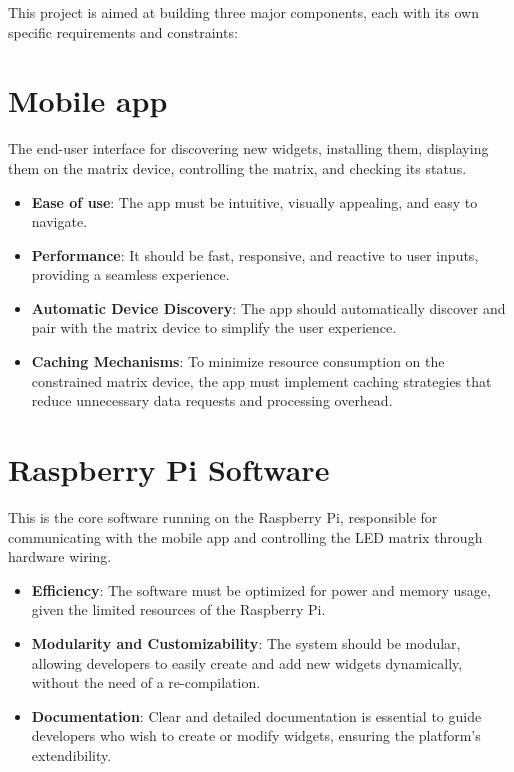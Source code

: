 
This project is aimed at building three major components, each with its own specific requirements
and constraints:

\section{Mobile app}

The end-user interface for discovering new widgets,
installing them, displaying them on the matrix device, controlling the
matrix, and checking its status.

\begin{itemize}
    \item \textbf{Ease of use}: The app must be intuitive, visually appealing,
        and easy to navigate.

    \item \textbf{Performance}: It should be fast, responsive, and reactive to
        user inputs, providing a seamless experience.

    \item \textbf{Automatic Device Discovery}: The app should automatically discover
        and pair with the matrix device to simplify the user experience.

    \item \textbf{Caching Mechanisms}: To minimize resource consumption on the
        constrained matrix device, the app must implement caching strategies
        that reduce unnecessary data requests and processing overhead.
\end{itemize}





\section{Raspberry Pi Software}

This is the core software running on the
Raspberry Pi, responsible for communicating with the mobile app and
controlling the LED matrix through hardware wiring. \label{software-objectives}
  
\begin{itemize}
    \item \textbf{Efficiency}: The software must be optimized for power and memory
        usage, given the limited resources of the Raspberry Pi.

    \item \textbf{Modularity and Customizability}: The system should be modular,
        allowing developers to easily create and add new widgets dynamically, without the need of a re-compilation.

    \item \textbf{Documentation}: Clear and detailed documentation is essential
        to guide developers who wish to create or modify widgets, ensuring the
        platform’s extendibility.
\end{itemize}



